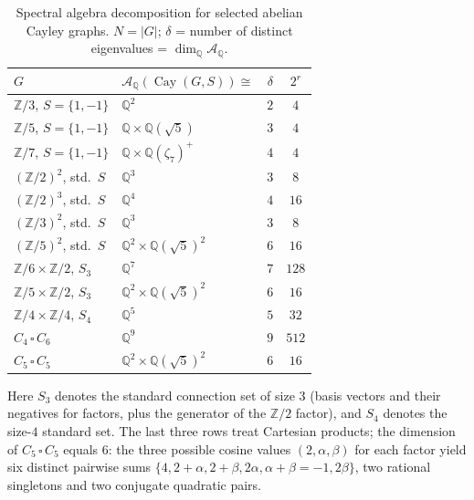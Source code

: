 \documentclass[12pt]{amsart}
\numberwithin{equation}{section}
\theoremstyle{plain}
\theoremstyle{definition}
\DeclareMathOperator{\Cay}{Cay}
\newcommand{\Z}{\mathbb{Z}}
\newcommand{\Q}{\mathbb{Q}}
\newcommand{\calA}{\mathcal{A}}
\begin{document}
\begin{table}[ht]
\centering
\caption{Spectral algebra decomposition for selected abelian Cayley graphs.
  $N = |G|$; $\delta$ = number of distinct eigenvalues = $\dim_\Q \calA_\Q$.}
\label{tab:data}
\renewcommand{\arraystretch}{1.15}
\small
\begin{tabular}{llcc}
\toprule
$G$ & $\calA_\Q(\Cay(G,S)) \cong$ & $\delta$ & $2^r$ \\
\midrule
$\Z/3$, $S=\{1,-1\}$ & $\Q^2$ & $2$ & $4$ \\
$\Z/5$, $S=\{1,-1\}$ & $\Q \times \Q(\sqrt{5})$ & $3$ & $4$ \\
$\Z/7$, $S=\{1,-1\}$ & $\Q \times \Q(\zeta_7)^+$ & $4$ & $4$ \\
$(\Z/2)^2$, std.\ $S$ & $\Q^3$ & $3$ & $8$ \\
$(\Z/2)^3$, std.\ $S$ & $\Q^4$ & $4$ & $16$ \\
$(\Z/3)^2$, std.\ $S$ & $\Q^3$ & $3$ & $8$ \\
$(\Z/5)^2$, std.\ $S$ & $\Q^2 \times \Q(\sqrt{5})^2$ & $6$ & $16$ \\
$\Z/6{\times}\Z/2$, $S_3$ & $\Q^7$ & $7$ & $128$ \\
$\Z/5{\times}\Z/2$, $S_3$ & $\Q^2 \times \Q(\sqrt{5})^2$ & $6$ & $16$ \\
$\Z/4{\times}\Z/4$, $S_4$ & $\Q^5$ & $5$ & $32$ \\
$C_4\,\square\, C_6$ & $\Q^9$ & $9$ & $512$ \\
$C_5\,\square\, C_5$ & $\Q^2 \times \Q(\sqrt{5})^2$ & $6$ & $16$ \\
\bottomrule
\end{tabular}
\end{table}

Here $S_3$ denotes the standard connection set of size $3$
(basis vectors and their negatives for factors, plus the generator of
the $\Z/2$ factor), and $S_4$ denotes the size-$4$ standard set.
The last three rows treat Cartesian products; the dimension of
$C_5 \,\square\, C_5$ equals $6$: the three possible cosine values
$(2, \alpha, \beta)$ for each factor yield six distinct pairwise sums
$\{4, 2+\alpha, 2+\beta, 2\alpha, \alpha+\beta=-1, 2\beta\}$,
two rational singletons and two conjugate quadratic pairs.
\end{document}
